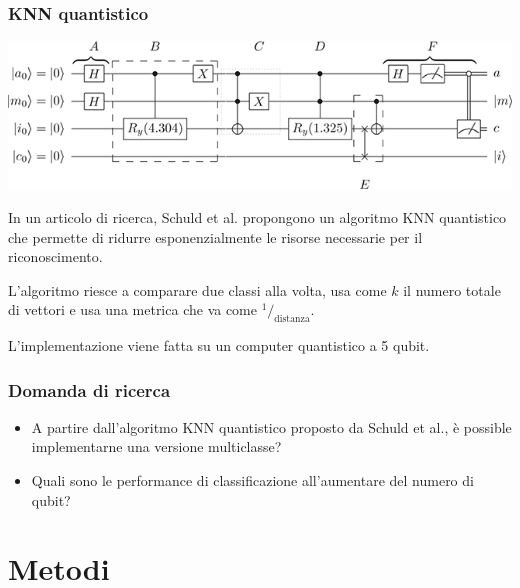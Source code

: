 \documentclass{beamer}
\begin{document}
	\begin{frame}
		\frametitle{KNN quantistico}
		\begin{center}
			\includegraphics[width=.75\textwidth]{gfx/schuld_circuito}
		\end{center}
		
		In un articolo di ricerca, Schuld et al. propongono un algoritmo KNN quantistico 
		che permette di ridurre esponenzialmente le risorse necessarie per il riconoscimento. 

		L'algoritmo riesce a comparare due classi alla volta, usa come $k$ il numero totale di 
		vettori e usa una metrica che va come $^1/_\text{distanza}$. 

		L'implementazione viene fatta su un computer quantistico a 5 qubit. 
	
	\end{frame}

	\begin{frame}
		\frametitle{Domanda di ricerca}
		\begin{itemize}
			\item A partire dall'algoritmo KNN quantistico proposto da Schuld et al., è possible 
			implementarne una versione multiclasse?
			\item Quali sono le performance di classificazione all'aumentare del numero di qubit?
		\end{itemize}
	\end{frame}

	\section{Metodi}
\end{document}
